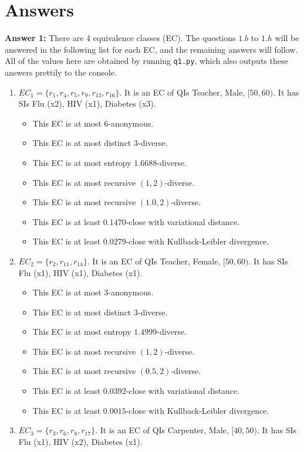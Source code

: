 \documentclass[12pt,reqno]{amsart}
\newcommand{\code}[1]{\texttt{#1}}
\begin{document}
\section*{Answers}
\textbf{Answer 1:} There are 4 equivalence classes (EC). The questions $1.b$ to $1.h$ will be answered in the following list for each EC, and the remaining answers will follow. All of the values here are obtained by running \code{q1.py}, which also outputs these answers prettily to the console.
\begin{enumerate}
 \item $EC_1 = \{r_1, r_4, r_5, r_9, r_{13}, r_{16}\}$. It is an EC of QIs Teacher, Male, $[50, 60)$. It has SIs Flu (x2), HIV (x1), Diabetes (x3).
 \begin{itemize}
 	\item This EC is at most $6$-anonymous.
 	\item This EC is at most distinct $3$-diverse.
 	\item This EC is at most entropy $1.6688$-diverse.
 	\item This EC is at most recursive $(1,2)$-diverse.
 	\item This EC is at most recursive $(1.0,2)$-diverse.
 	\item This EC is at least $0.1470$-close with variational distance.
 	\item This EC is at least $0.0279$-close with Kullback-Leibler divergence.
 \end{itemize}
 \item $EC_2 = \{r_2, r_{11}, r_{14}\}$. It is an EC of QIs Teacher, Female, $[50, 60)$. It has SIs Flu (x1), HIV (x1), Diabetes (x1).
  \begin{itemize}
 	\item This EC is at most $3$-anonymous.
 	\item This EC is at most distinct $3$-diverse.
 	\item This EC is at most entropy $1.4999$-diverse.
 	\item This EC is at most recursive $(1,2)$-diverse.
 	\item This EC is at most recursive $(0.5,2)$-diverse.
 	\item This EC is at least $0.0392$-close with variational distance.
 	\item This EC is at least $0.0015$-close with Kullback-Leibler divergence.
 \end{itemize}
 \item $EC_3 = \{r_3, r_6, r_8, r_{17}\}$. It is an EC of QIs Carpenter, Male, $[40, 50)$. It has SIs Flu (x1), HIV (x2), Diabetes (x1).

\end{enumerate}
\end{document}
